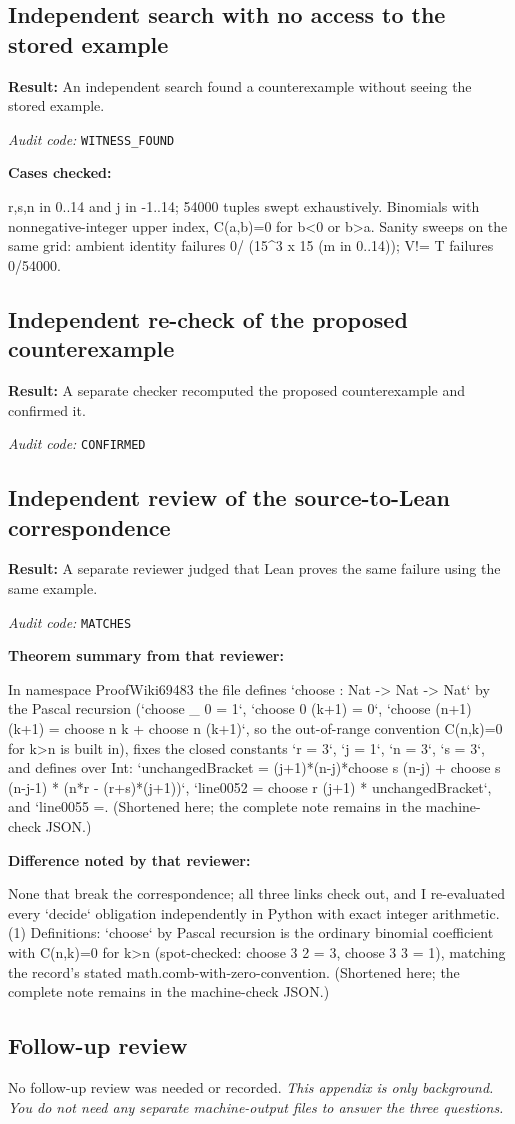 \documentclass[11pt]{article}
\begin{document}
\subsection*{Independent search with no access to the stored example}
\textbf{Result:} An independent search found a counterexample without seeing the stored example.
\par\textit{Audit code:} \nolinkurl{WITNESS_FOUND}
\par\textbf{Cases checked:}
\begin{Vsrc}
r,s,n in 0..14 and j in -1..14; 54000 tuples swept exhaustively. Binomials with nonnegative-integer upper index, C(a,b)=0 for b<0 or b>a. Sanity sweeps on the same grid: ambient identity failures 0/ (15^3 x 15 (m in 0..14)); V!= T failures 0/54000.
\end{Vsrc}
\subsection*{Independent re-check of the proposed counterexample}
\textbf{Result:} A separate checker recomputed the proposed counterexample and confirmed it.
\par\textit{Audit code:} \nolinkurl{CONFIRMED}
\subsection*{Independent review of the source-to-Lean correspondence}
\textbf{Result:} A separate reviewer judged that Lean proves the same failure using the same example.
\par\textit{Audit code:} \nolinkurl{MATCHES}
\par\textbf{Theorem summary from that reviewer:}
\begin{Vsrc}
In namespace ProofWiki69483 the file defines `choose : Nat -> Nat -> Nat` by the Pascal recursion (`choose _ 0 = 1`, `choose 0 (k+1) = 0`, `choose (n+1) (k+1) = choose n k + choose n (k+1)`, so the out-of-range convention C(n,k)=0 for k>n is built in), fixes the closed constants `r = 3`, `j = 1`, `n = 3`, `s = 3`, and defines over Int: `unchangedBracket = (j+1)*(n-j)*choose s (n-j) + choose s (n-j-1) * (n*r - (r+s)*(j+1))`, `line0052 = choose r (j+1) * unchangedBracket`, and `line0055 =. (Shortened here; the complete note remains in the machine-check JSON.)
\end{Vsrc}
\par\textbf{Difference noted by that reviewer:}
\begin{Vsrc}
None that break the correspondence; all three links check out, and I re-evaluated every `decide` obligation independently in Python with exact integer arithmetic. (1) Definitions: `choose` by Pascal recursion is the ordinary binomial coefficient with C(n,k)=0 for k>n (spot-checked: choose 3 2 = 3, choose 3 3 = 1), matching the record's stated math.comb-with-zero-convention. (Shortened here; the complete note remains in the machine-check JSON.)
\end{Vsrc}
\subsection*{Follow-up review}
No follow-up review was needed or recorded.
\textit{This appendix is only background. You do not need any separate machine-output files to answer the three questions.}
\end{document}
